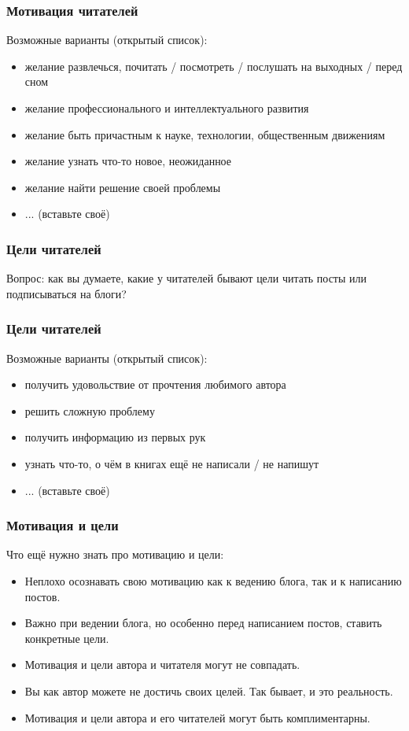 \documentclass[14pt]{beamer}
\begin{document}
\begin{frame}
  \frametitle{Мотивация читателей}
  Возможные варианты (открытый список):
  \begin{itemize}
  \item желание развлечься, почитать / посмотреть / послушать на выходных / перед сном
  \item желание профессионального и интеллектуального развития
  \item желание быть причастным к науке, технологии, общественным движениям
  \item желание узнать что-то новое, неожиданное
  \item желание найти решение своей проблемы
  \item ... (вставьте своё)
  \end{itemize}
\end{frame}

\begin{frame}
  \frametitle{Цели читателей}
  Вопрос: как вы думаете, какие у читателей бывают цели читать посты или подписываться на блоги?
\end{frame}

\begin{frame}
  \frametitle{Цели читателей}
  Возможные варианты (открытый список):
  \begin{itemize}
  \item получить удовольствие от прочтения любимого автора
  \item решить сложную проблему
  \item получить информацию из первых рук
  \item узнать что-то, о чём в книгах ещё не написали / не напишут
  \item ... (вставьте своё)
  \end{itemize}
\end{frame}

\begin{frame}
  \frametitle{Мотивация и цели}
  Что ещё нужно знать про мотивацию и цели:
  \begin{itemize}
  \item Неплохо осознавать свою мотивацию как к ведению блога, так и к написанию постов.
  \item Важно при ведении блога, но особенно перед написанием постов, ставить конкретные цели.
  \item Мотивация и цели автора и читателя могут не совпадать.
  \item Вы как автор можете не достичь своих целей. Так бывает, и это реальность.
  \item Мотивация и цели автора и его читателей могут быть комплиментарны.
  \end{itemize}
\end{frame}
\end{document}
